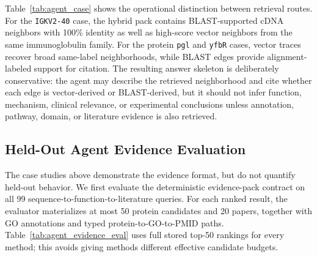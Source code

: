\documentclass[11pt]{article}
\begin{document}
\begin{table}[t]
\centering
\caption{Agent-style evidence packs generated from DRAG traces. Hybrid DRAG keeps both broad vector context and BLAST-labeled verification edges visible to the downstream agent.}
\label{tab:agent_case}
\end{table}

Table~\ref{tab:agent_case} shows the operational distinction between retrieval routes. For the \texttt{IGKV2-40} case, the hybrid pack contains BLAST-supported cDNA neighbors with 100\% identity as well as high-score vector neighbors from the same immunoglobulin family. For the protein \texttt{pgl} and \texttt{yfbR} cases, vector traces recover broad same-label neighborhoods, while BLAST edges provide alignment-labeled support for citation. The resulting answer skeleton is deliberately conservative: the agent may describe the retrieved neighborhood and cite whether each edge is vector-derived or BLAST-derived, but it should not infer function, mechanism, clinical relevance, or experimental conclusions unless annotation, pathway, domain, or literature evidence is also retrieved.

\subsection{Held-Out Agent Evidence Evaluation}

The case studies above demonstrate the evidence format, but do not quantify held-out behavior. We first evaluate the deterministic evidence-pack contract on all 99 sequence-to-function-to-literature queries. For each ranked result, the evaluator materializes at most 50 protein candidates and 20 papers, together with GO annotations and typed protein-to-GO-to-PMID paths. Table~\ref{tab:agent_evidence_eval} uses full stored top-50 rankings for every method; this avoids giving methods different effective candidate budgets.
\end{document}

